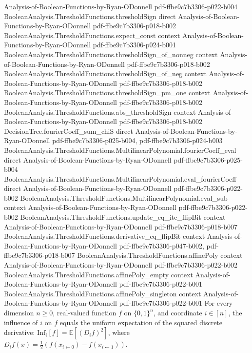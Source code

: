 \begin{lemma}
  {Analysis-of-Boolean-Functions-by-Ryan-ODonnell}
  {pdf-ffbe9c7b3306-p022-b004}
\proofstep
  {BooleanAnalysis.ThresholdFunctions.thresholdSign}
  {direct}
  {Analysis-of-Boolean-Functions-by-Ryan-ODonnell}
  {pdf-ffbe9c7b3306-p018-b002}
\proofstep
  {BooleanAnalysis.ThresholdFunctions.expect_const}
  {context}
  {Analysis-of-Boolean-Functions-by-Ryan-ODonnell}
  {pdf-ffbe9c7b3306-p024-b001}
\proofstep
  {BooleanAnalysis.ThresholdFunctions.thresholdSign_of_nonneg}
  {context}
  {Analysis-of-Boolean-Functions-by-Ryan-ODonnell}
  {pdf-ffbe9c7b3306-p018-b002}
\proofstep
  {BooleanAnalysis.ThresholdFunctions.thresholdSign_of_neg}
  {context}
  {Analysis-of-Boolean-Functions-by-Ryan-ODonnell}
  {pdf-ffbe9c7b3306-p018-b002}
\proofstep
  {BooleanAnalysis.ThresholdFunctions.thresholdSign_pm_one}
  {context}
  {Analysis-of-Boolean-Functions-by-Ryan-ODonnell}
  {pdf-ffbe9c7b3306-p018-b002}
\proofstep
  {BooleanAnalysis.ThresholdFunctions.abs_thresholdSign}
  {context}
  {Analysis-of-Boolean-Functions-by-Ryan-ODonnell}
  {pdf-ffbe9c7b3306-p018-b002}
\proofstep
  {DecisionTree.fourierCoeff_sum_chiS}
  {direct}
  {Analysis-of-Boolean-Functions-by-Ryan-ODonnell}
  {pdf-ffbe9c7b3306-p025-b004,
    pdf-ffbe9c7b3306-p024-b003}
\proofstep
  {BooleanAnalysis.ThresholdFunctions.MultilinearPolynomial.fourierCoeff_eval}
  {direct}
  {Analysis-of-Boolean-Functions-by-Ryan-ODonnell}
  {pdf-ffbe9c7b3306-p025-b004}
\proofstep
  {BooleanAnalysis.ThresholdFunctions.MultilinearPolynomial.eval_fourierCoeff}
  {direct}
  {Analysis-of-Boolean-Functions-by-Ryan-ODonnell}
  {pdf-ffbe9c7b3306-p022-b002}
\proofstep
  {BooleanAnalysis.ThresholdFunctions.MultilinearPolynomial.eval_sub}
  {context}
  {Analysis-of-Boolean-Functions-by-Ryan-ODonnell}
  {pdf-ffbe9c7b3306-p022-b002}
\proofstep
  {BooleanAnalysis.ThresholdFunctions.update_eq_ite_flipBit}
  {context}
  {Analysis-of-Boolean-Functions-by-Ryan-ODonnell}
  {pdf-ffbe9c7b3306-p018-b007}
\proofstep
  {BooleanAnalysis.ThresholdFunctions.derivative_eq_flipBit}
  {context}
  {Analysis-of-Boolean-Functions-by-Ryan-ODonnell}
  {pdf-ffbe9c7b3306-p047-b002,
    pdf-ffbe9c7b3306-p018-b007}
\proofstep
  {BooleanAnalysis.ThresholdFunctions.affinePoly}
  {context}
  {Analysis-of-Boolean-Functions-by-Ryan-ODonnell}
  {pdf-ffbe9c7b3306-p022-b002}
\proofstep
  {BooleanAnalysis.ThresholdFunctions.affinePoly_empty}
  {context}
  {Analysis-of-Boolean-Functions-by-Ryan-ODonnell}
  {pdf-ffbe9c7b3306-p022-b001}
\proofstep
  {BooleanAnalysis.ThresholdFunctions.affinePoly_singleton}
  {context}
  {Analysis-of-Boolean-Functions-by-Ryan-ODonnell}
  {pdf-ffbe9c7b3306-p022-b001}
For every dimension $n\ge0$, real-valued function $f$ on $\{0,1\}^n$, and coordinate
$i\in[n]$, the influence of $i$ on $f$ equals the uniform expectation of the squared
discrete derivative: $\mathrm{Inf}_i[f]=\mathbb E[(D_i f)^2]$, where $D_i
f(x)=\tfrac12(f(x_{i\leftarrow0})-f(x_{i\leftarrow1}))$.
\end{lemma}

